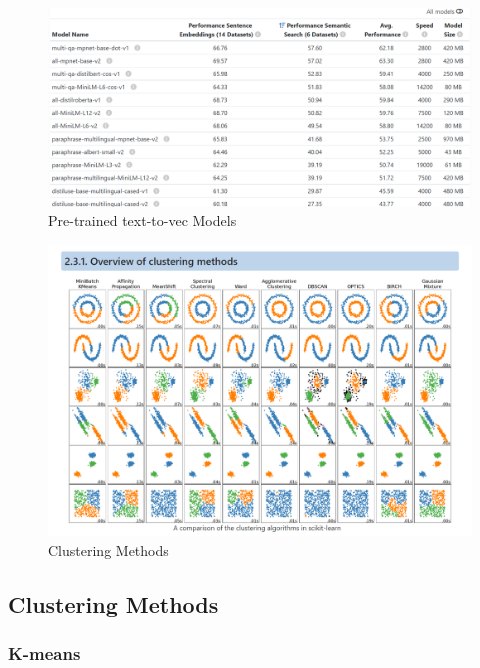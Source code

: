 \documentclass[conference]{IEEEtran}
\begin{document}
\begin{figure}
\centering
\includegraphics[width=160mm]{pretrained_models.png}
\caption{Pre-trained text-to-vec Models \cite{ref1}}
\label{fig_pretrained_models}
\end{figure}
\vspace{3pt}



\begin{figure}
\centering
\includegraphics[width=160mm]{clustering_methods.png}
\caption{Clustering Methods \cite{pedregosa2011scikit}}
\label{fig_clustering_methods}
\end{figure}
\vspace{3pt}


\subsection{Clustering Methods}

\subsubsection{K-means}
\end{document}
